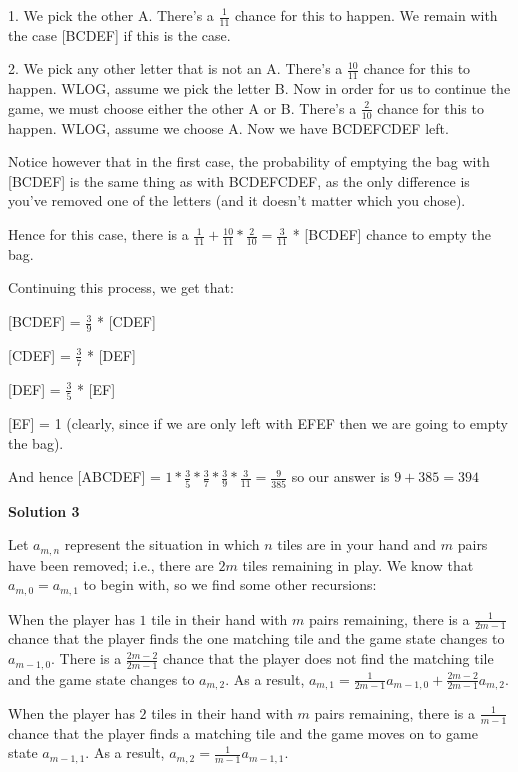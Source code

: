 \begin{enumerate}
 1. We pick the other A. There's a $\frac{1}{11}$ chance for this to happen. We remain with the case [BCDEF] if this is the case.

 2. We pick any other letter that is not an A. There's a $\frac{10}{11}$ chance for this to happen. WLOG, assume we pick the letter B. Now in order for us to continue the game, we must choose either the other A or B. There's a $\frac{2}{10}$ chance for this to happen. WLOG, assume we choose A. Now we have BCDEFCDEF left.

 Notice however that in the first case, the probability of emptying the bag with [BCDEF] is the same thing as with BCDEFCDEF, as the only difference is you've removed one of the letters (and it doesn't matter which you chose). 

 Hence for this case, there is a $\frac{1}{11} + \frac{10}{11}*\frac{2}{10} = \frac{3}{11}$ * [BCDEF] chance to empty the bag.

 Continuing this process, we get that: 

 [BCDEF] = $\frac{3}{9}$ * [CDEF]

 [CDEF] = $\frac{3}{7}$ * [DEF]

 [DEF] = $\frac{3}{5}$ * [EF]

 [EF] = 1 (clearly, since if we are only left with EFEF then we are going to empty the bag).

 And hence [ABCDEF] = $1*\frac{3}{5}*\frac{3}{7}*\frac{3}{9}*\frac{3}{11} = \frac{9}{385}$ so our answer is $9+385=\boxed{394}$




\textbf{Solution 3}

Let $a_{m,n}$ represent the situation in which $n$ tiles are in your hand and $m$ pairs have been removed; i.e., there are $2m$ tiles remaining in play. We know that $a_{m,0}=a_{m,1}$ to begin with, so we find some other recursions:

 When the player has $1$ tile in their hand with $m$ pairs remaining, there is a $\frac{1}{2m-1}$ chance that the player finds the one matching tile and the game state changes to $a_{m-1,0}$. There is a $\frac{2m-2}{2m-1}$ chance that the player does not find the matching tile and the game state changes to $a_{m,2}$. As a result, $a_{m,1}=\frac{1}{2m-1}a_{m-1,0}+\frac{2m-2}{2m-1}a_{m,2}$.

 When the player has $2$ tiles in their hand with $m$ pairs remaining, there is a $\frac{1}{m-1}$ chance that the player finds a matching tile and the game moves on to game state $a_{m-1,1}$. As a result, $a_{m,2}=\frac{1}{m-1}a_{m-1,1}$.


\end{enumerate}
